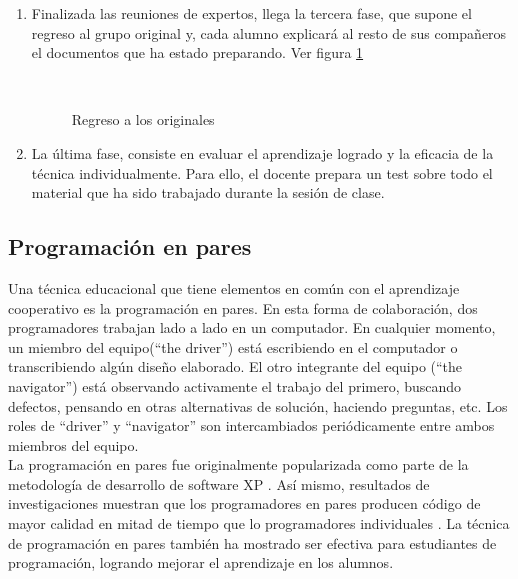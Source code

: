 \begin{enumerate}
    \item Finalizada las reuniones de expertos, llega la tercera fase, que supone el regreso al grupo original y, cada alumno explicará al resto de sus compañeros el documentos que ha estado preparando. Ver figura \ref{fig:jigsaw03}

\begin{figure}[h]
  \centering
  \\
  \caption{Regreso a los originales}\label{fig:jigsaw03}
\end{figure}

\item La última fase, consiste en evaluar el aprendizaje logrado y la eficacia de la técnica individualmente. Para ello, el docente prepara un test sobre todo el material que ha sido trabajado durante la sesión de clase.

\end{enumerate}

\subsection{Programación en pares}
Una técnica educacional que tiene elementos en común con el aprendizaje cooperativo es la programación en pares. En esta forma de colaboración, dos programadores trabajan lado a lado en un computador. En cualquier momento, un miembro del equipo(``the driver'') está escribiendo en el computador o transcribiendo algún diseño elaborado. El otro integrante del equipo (``the navigator'') está observando activamente el trabajo del primero, buscando defectos, pensando en otras alternativas de solución, haciendo preguntas, etc. Los roles de ``driver'' y ``navigator'' son intercambiados periódicamente entre ambos miembros del equipo.\\

La programación en pares fue originalmente popularizada como parte de la metodología de desarrollo de software XP \cite{beck_extreme_2000}. Así mismo, resultados de investigaciones muestran que los programadores en pares producen código de mayor calidad en mitad de tiempo que lo programadores individuales \cite{williams2000collaborative,williams_strengthening_2000}. La técnica de programación en pares también ha mostrado ser efectiva para estudiantes de programación, logrando mejorar el aprendizaje en los alumnos\cite{mcdowell_effects_2002}.

